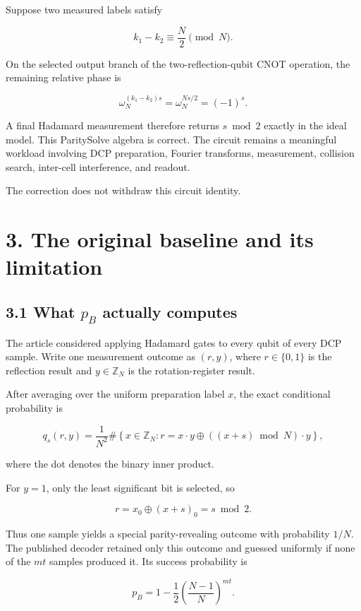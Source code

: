 \documentclass[
  10pt,
]{article}
\begin{document}
Suppose two measured labels satisfy

\[
k_1-k_2\equiv \frac N2\pmod N.
\]

On the selected output branch of the two-reflection-qubit CNOT
operation, the remaining relative phase is

\[
\omega_N^{(k_1-k_2)s}
=
\omega_N^{Ns/2}
=
(-1)^s.
\]

A final Hadamard measurement therefore returns \(s\bmod2\) exactly in
the ideal model. This ParitySolve algebra is correct. The circuit
remains a meaningful workload involving DCP preparation, Fourier
transforms, measurement, collision search, inter-cell interference, and
readout.

The correction does not withdraw this circuit identity.

\section{3. The original baseline and its
limitation}\label{the-original-baseline-and-its-limitation}

\subsection{\texorpdfstring{3.1 What \(p_B\) actually
computes}{3.1 What p\_B actually computes}}\label{what-p_b-actually-computes}

The article considered applying Hadamard gates to every qubit of every
DCP sample. Write one measurement outcome as \((r,y)\), where
\(r\in\{0,1\}\) is the reflection result and \(y\in\mathbb Z_N\) is the
rotation-register result.

After averaging over the uniform preparation label \(x\), the exact
conditional probability is

\[
q_s(r,y)
=
\frac1{N^2}
\#\left\{
 x\in\mathbb Z_N:
 r=x\mathbin{\cdot}y
 \oplus
 ((x+s)\bmod N)\mathbin{\cdot}y
\right\},
\]

where the dot denotes the binary inner product.

For \(y=1\), only the least significant bit is selected, so

\[
r=x_0\oplus(x+s)_0=s\bmod2.
\]

Thus one sample yields a special parity-revealing outcome with
probability \(1/N\). The published decoder retained only this outcome
and guessed uniformly if none of the \(mt\) samples produced it. Its
success probability is

\[
\boxed{
 p_B
 =
 1-\frac12\left(\frac{N-1}{N}\right)^{mt}
}.
\]
\end{document}
